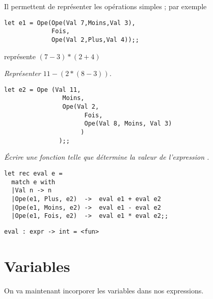 Il permettent de représenter les opérations simples ; par exemple 
\begin{lstlisting}
let e1 = Ope(Ope(Val 7,Moins,Val 3), 
             Fois, 
             Ope(Val 2,Plus,Val 4));;
\end{lstlisting}
représente $(7-3)*(2+4)$
\begin{Exercise}\it
Représenter $11 - (2 * (8-3))$.
\end{Exercise}
\begin{Answer}
\begin{lstlisting}
let e2 = Ope (Val 11,
                Moins,
                Ope(Val 2,
                      Fois,
                      Ope(Val 8, Moins, Val 3)
                     )
               );;
\end{lstlisting} 
\end{Answer}
\begin{Exercise}\it
Écrire une fonction  telle que  détermine la valeur de l'expression .
\end{Exercise}
\begin{Answer}
\begin{lstlisting}
let rec eval e =
  match e with
  |Val n -> n
  |Ope(e1, Plus, e2)  ->  eval e1 + eval e2
  |Ope(e1, Moins, e2) ->  eval e1 - eval e2
  |Ope(e1, Fois, e2)  ->  eval e1 * eval e2;;
\end{lstlisting} 
\end{Answer}
\begin{lstlisting}
eval : expr -> int = <fun>
\end{lstlisting}
\section{Variables}
On va maintenant incorporer les variables dans nos expressions.

